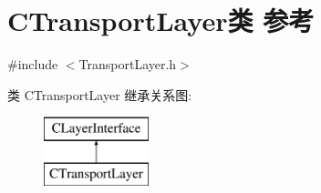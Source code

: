 \hypertarget{class_c_transport_layer}{}\section{C\+Transport\+Layer类 参考}
\label{class_c_transport_layer}


{\ttfamily \#include $<$Transport\+Layer.\+h$>$}

类 C\+Transport\+Layer 继承关系图\+:\begin{figure}[H]
\begin{center}
\leavevmode
\includegraphics[height=2.000000cm]{class_c_transport_layer}
\end{center}
\end{figure}
